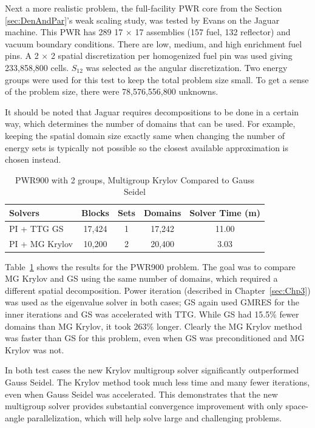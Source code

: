 Next a more realistic problem, the full-facility PWR core from the Section \ref{sec:DenAndPar}'s weak scaling study, was tested by Evans on the Jaguar machine. This PWR has 289 17 $\times$ 17 assemblies (157 fuel, 132 reflector) and vacuum boundary conditions. There are low, medium, and high enrichment fuel pins. A 2 $\times$ 2 spatial discretization per homogenized fuel pin was used giving 233,858,800 cells. $S_{12}$ was selected as the angular discretization. Two energy groups were used for this test to keep the total problem size small. To get a sense of the problem size, there were 78,576,556,800 unknowns.

It should be noted that Jaguar requires decompositions to be done in a certain way, which determines the number of domains that can be used. For example, keeping the spatial domain size exactly same when changing the number of energy sets is typically not possible so the closest available approximation is chosen instead.

\begin{table}[!h]
\caption{PWR900 with 2 groups, Multigroup Krylov Compared to Gauss Seidel}
\begin{center}
\begin{tabular}{| l | c | c | c | c |}
\hline
Solvers & Blocks & Sets & Domains & Solver Time (m) \\[0.5ex]
\hline
PI + TTG GS & 17,424 & 1 & 17,242 & 11.00 \\
PI + MG Krylov & 10,200 & 2 & 20,400 & 3.03 \\
\hline
\end{tabular}
\end{center}
\label{table:MGkrylovPWR}
\end{table}
%
Table~\ref{table:MGkrylovPWR} shows the results for the PWR900 problem. The goal was to compare MG Krylov and GS using the same number of domains, which required a different spatial decomposition. Power iteration (described in Chapter~\ref{sec:Chp3}) was used as the eigenvalue solver in both cases; GS again used GMRES for the inner iterations and GS was accelerated with TTG. While GS had 15.5\% fewer domains than MG Krylov, it took 263\% longer. Clearly the MG Krylov method was faster than GS for this problem, even when GS was preconditioned and MG Krylov was not. 

In both test cases the new Krylov multigroup solver significantly outperformed Gauss Seidel. The Krylov method took much less time and many fewer iterations, even when Gauss Seidel was accelerated. This demonstrates that the new multigroup solver provides substantial convergence improvement with only space-angle parallelization, which will help solve large and challenging problems. 

